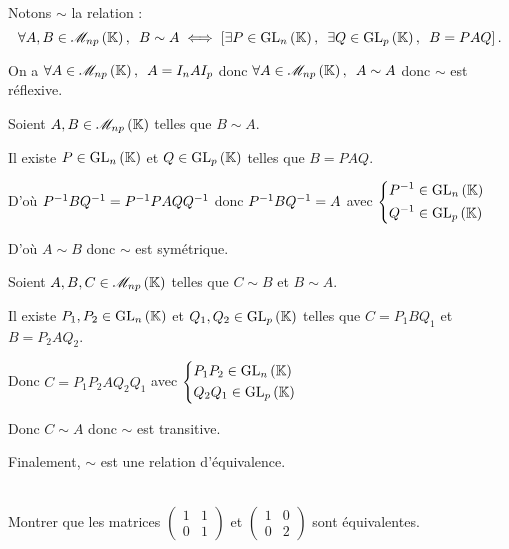 \begin{dem}
Notons \(\sim\) la relation  : \[\quantifs{\forall A,B\in\M{np}}B\sim A\ssi\croch{\quantifs{\exists P\in\GL{n};\exists Q\in\GL{p}}B=PAQ}.\]

On a \(\quantifs{\forall A\in\M{np}}A=I_nAI_p\) donc \(\quantifs{\forall A\in\M{np}}A\sim A\) donc \(\sim\) est réflexive.

Soient \(A,B\in\M{np}\) telles que \(B\sim A\).

Il existe \(P\in\GL{n}\) et \(Q\in\GL{p}\) telles que \(B=PAQ\).

D'où \(P^{-1} BQ^{-1}=P^{-1} PAQQ^{-1}\) donc \(P^{-1} BQ^{-1}=A\) avec \(\begin{dcases}
P\inv\in\GL{n} \\
Q\inv\in\GL{p}
\end{dcases}\)

D'où \(A\sim B\) donc \(\sim\) est symétrique.

Soient \(A,B,C\in\M{np}\) telles que \(C\sim B\) et \(B\sim A\).

Il existe \(P_1,P_2\in\GL{n}\) et \(Q_1,Q_2\in\GL{p}\) telles que \(C=P_1BQ_1\) et \(B=P_2AQ_2\).

Donc \(C=P_1P_2AQ_2Q_1\) avec \(\begin{dcases}
P_1P_2\in\GL{n} \\
Q_2Q_1\in\GL{p}
\end{dcases}\)

Donc \(C\sim A\) donc \(\sim\) est transitive.

Finalement, \(\sim\) est une relation d'équivalence.
\end{dem}

\begin{exoex}~\\
Montrer que les matrices \(\begin{pmatrix}
1 & 1 \\
0 & 1
\end{pmatrix}\) et \(\begin{pmatrix}
1 & 0 \\
0 & 2
\end{pmatrix}\) sont équivalentes.
\end{exoex}

